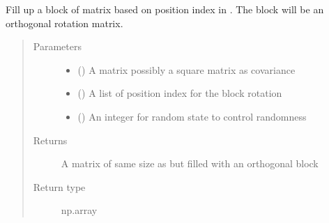 \documentclass[letterpaper,10pt,english]{sphinxmanual}
\begin{document}

\begin{fulllineitems}
\label{\detokenize{Utilities:pysimrel.utilities.get_rotate}}
Fill up a block of matrix  based on position index in .
The block will be an orthogonal rotation matrix.
\begin{quote}\begin{description}
\item[{Parameters}] \leavevmode\begin{itemize}
\item {} 
 () \textendash{} A matrix possibly a square matrix as covariance

\item {} 
 () \textendash{} A list of position index for the block rotation

\item {} 
 () \textendash{} An integer for random state to control randomness

\end{itemize}

\item[{Returns}] \leavevmode
A matrix of same size as  but filled with an orthogonal block

\item[{Return type}] \leavevmode
np.array

\end{description}\end{quote}

\end{fulllineitems}

\end{document}

